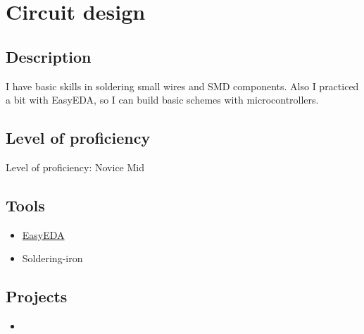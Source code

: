 \section{Circuit design}

\subsection{Description}

I have basic skills in soldering small wires and SMD components.
Also I practiced a bit with EasyEDA, so I can build basic schemes
with microcontrollers.

\subsection{Level of proficiency}

Level of proficiency: Novice Mid

\subsection{Tools}

\begin{itemize}
    \item \href{https://github.com/dkushche/EasyEDA}{EasyEDA}
    \item Soldering-iron
\end{itemize}

\subsection{Projects}

\begin{itemize}
    \item \noprojects
\end{itemize}

\newpage
